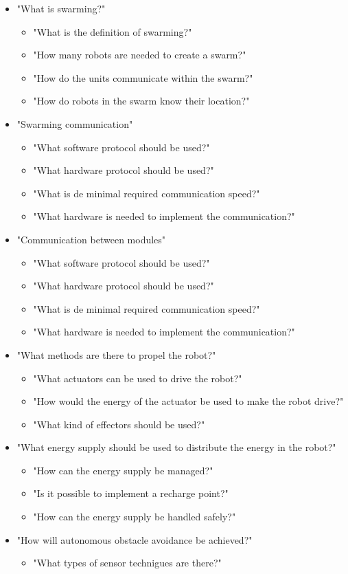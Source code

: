 \documentclass[10pt,a4paper]{article}
\begin{document}
\begin{itemize}

    \item "What is swarming?"
    \begin{itemize}
        \item "What is the definition of swarming?"
        \item "How many robots are needed to create a swarm?"
        \item "How do the units communicate within the swarm?"
        \item "How do robots in the swarm know their location?"
    \end{itemize}    
    \item "Swarming communication"
    \begin{itemize}
        \item "What software protocol should be used?"
        \item "What hardware protocol should be used?"
        \item "What is de minimal required communication speed?"
        \item "What hardware is needed to implement the communication?"
    \end{itemize}
        \item "Communication between modules"
    \begin{itemize}
        \item "What software protocol should be used?"
        \item "What hardware protocol should be used?"
        \item "What is de minimal required communication speed?"
        \item "What hardware is needed to implement the communication?"
    \end{itemize}
    \item "What methods are there to propel the robot?"
    \begin{itemize}
        \item "What actuators can be used to drive the robot?"
        \item "How would the energy of the actuator be used to make the robot drive?"
        \item "What kind of effectors should be used?"
    \end{itemize}
    \item "What energy supply should be used to distribute the energy in the robot?"
    \begin{itemize}
        \item "How can the energy supply be managed?"
        \item "Is it possible to implement a recharge point?"
        \item "How can the energy supply be handled safely?"
    \end{itemize}
    \item "How will autonomous obstacle avoidance be achieved?"
    \begin{itemize}
   		 \item "What types of sensor technigues are there?"
    \end{itemize}
\end{itemize}
\end{document}
